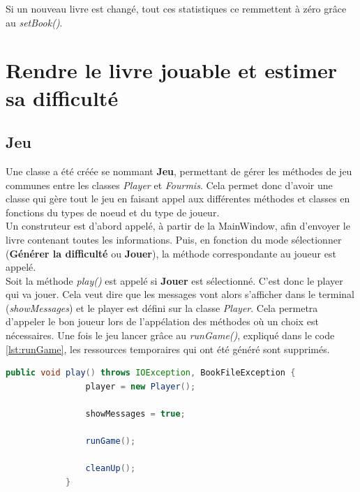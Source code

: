 		Si un nouveau livre est changé, tout ces statistiques ce remmettent à zéro grâce au \textit{setBook()}.



	\section{Rendre le livre jouable et estimer sa difficulté}\label{sec:Jeu}
		\subsection{Jeu}
		Une classe a été créée se nommant \textbf{Jeu}, permettant de gérer les méthodes de jeu communes entre les classes \textit{Player} et \textit{Fourmis}. Cela permet donc d'avoir une classe qui gère tout le jeu en faisant appel aux différentes méthodes et classes en fonctions du types de noeud et du type de joueur. \\
		Un construteur est d'abord appelé, à partir de la MainWindow, afin d'envoyer le livre contenant toutes les informations. Puis, en fonction du mode sélectionner (\textbf{Générer la difficulté} ou \textbf{Jouer}), la méthode correspondante au joueur est appelé.\\

		Soit la méthode \textit{play()} est appelé si \textbf{Jouer} est sélectionné. C'est donc le player qui va jouer. Cela veut dire que les messages vont alors s'afficher dans le terminal (\textit{showMessages}) et le player est défini sur la classe \textit{Player}. Cela permetra d'appeler le bon joueur lors de l'appélation des méthodes où un choix est nécessaires.
		Une fois le jeu lancer grâce au \textit{runGame()}, expliqué dans le code \ref{lst:runGame}, les ressources temporaires qui ont été généré sont supprimés.

		\begin{lstlisting}[gobble=12, language=java, caption=play()]
			public void play() throws IOException, BookFileException {
				player = new Player();

				showMessages = true;

				runGame();

				cleanUp();
			}
		\end{lstlisting}

